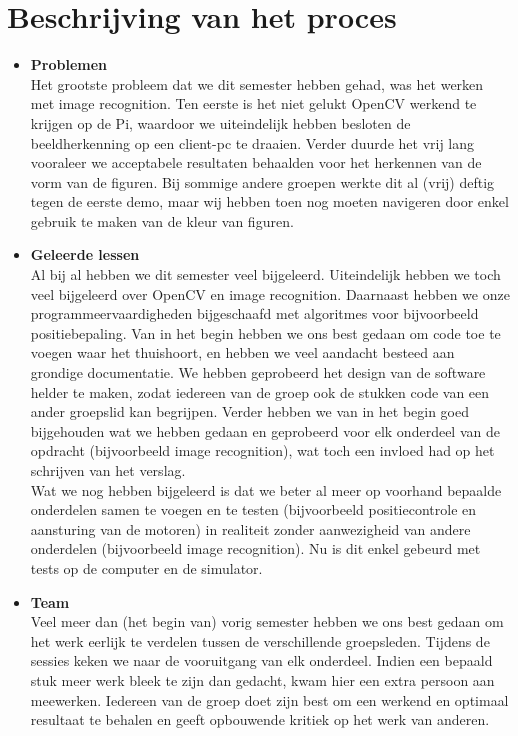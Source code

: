 \documentclass[eind]{penoverslag}
\begin{document}
\section{Beschrijving van het proces}
\begin{itemize}
\item \textbf{Problemen}\\ Het grootste probleem dat we dit semester hebben gehad, was het werken met image recognition. Ten eerste is het niet gelukt OpenCV werkend te krijgen op de Pi, waardoor we uiteindelijk hebben besloten de beeldherkenning op een client-pc te draaien. Verder duurde het vrij lang vooraleer we acceptabele resultaten behaalden voor het herkennen van de vorm van de figuren. Bij sommige andere groepen werkte dit al (vrij) deftig tegen de eerste demo, maar wij hebben toen nog moeten navigeren door enkel gebruik te maken van de kleur van figuren.
\item \textbf{Geleerde lessen}\\ Al bij al hebben we dit semester veel bijgeleerd. Uiteindelijk hebben we toch veel bijgeleerd over OpenCV en image recognition. Daarnaast hebben we onze programmeervaardigheden bijgeschaafd met algoritmes voor bijvoorbeeld positiebepaling. Van in het begin hebben we ons best gedaan om code toe te voegen waar het thuishoort, en hebben we veel aandacht besteed aan grondige documentatie. We hebben geprobeerd het design van de software helder te maken, zodat iedereen van de groep ook de stukken code van een ander groepslid kan begrijpen. Verder hebben we van in het begin goed bijgehouden wat we hebben gedaan en geprobeerd voor elk onderdeel van de opdracht (bijvoorbeeld image recognition), wat toch een invloed had op het schrijven van het verslag.\\
Wat we nog hebben bijgeleerd is dat we beter al meer op voorhand bepaalde onderdelen samen te voegen en te testen (bijvoorbeeld positiecontrole en aansturing van de motoren) in realiteit zonder aanwezigheid van andere onderdelen (bijvoorbeeld image recognition). Nu is dit enkel gebeurd met tests op de computer en de simulator.
\item \textbf{Team}\\ Veel meer dan (het begin van) vorig semester hebben we ons best gedaan om het werk eerlijk te verdelen tussen de verschillende groepsleden. Tijdens de sessies keken we naar de vooruitgang van elk onderdeel. Indien een bepaald stuk meer werk bleek te zijn dan gedacht, kwam hier een extra persoon aan meewerken. Iedereen van de groep doet zijn best om een werkend en optimaal resultaat te behalen en geeft opbouwende kritiek op het werk van anderen.
\end{itemize}
\end{document}

